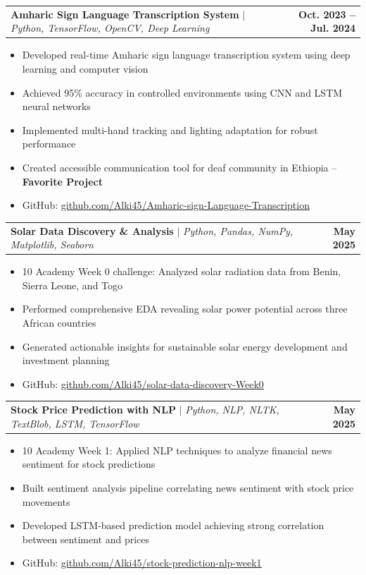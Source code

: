 \documentclass[letterpaper,11pt]{article}
\makeatletter
\newcommand{\resumeItem}[1]{
  \item\small{
    {#1 \vspace{-2pt}}
  }
}
\newcommand{\resumeProjectHeading}[2]{
    \item
    \begin{tabular*}{1.001\textwidth}{l@{\extracolsep{\fill}}r}
      \small#1 & \textbf{\small #2}\\
    \end{tabular*}\vspace{-7pt}
}
\newcommand{\resumeItemListStart}{\begin{itemize}}
\newcommand{\resumeItemListEnd}{\end{itemize}\vspace{-5pt}}
\makeatother
\begin{document}
      \resumeProjectHeading
          {\textbf{Amharic Sign Language Transcription System} $|$ \emph{Python, TensorFlow, OpenCV, Deep Learning}}{Oct. 2023 -- Jul. 2024}
          \resumeItemListStart
            \resumeItem{Developed real-time Amharic sign language transcription system using deep learning and computer vision}
            \resumeItem{Achieved 95\% accuracy in controlled environments using CNN and LSTM neural networks}
            \resumeItem{Implemented multi-hand tracking and lighting adaptation for robust performance}
            \resumeItem{Created accessible communication tool for deaf community in Ethiopia -- \textbf{Favorite Project}}
            \resumeItem{GitHub: \href{https://github.com/Alki45/Amharic-sign-Language-Transcription}{\underline{github.com/Alki45/Amharic-sign-Language-Transcription}}}
          \resumeItemListEnd
          \vspace{-13pt}
          
      \resumeProjectHeading
          {\textbf{Solar Data Discovery \& Analysis} $|$ \emph{Python, Pandas, NumPy, Matplotlib, Seaborn}}{May 2025}
          \resumeItemListStart
            \resumeItem{10 Academy Week 0 challenge: Analyzed solar radiation data from Benin, Sierra Leone, and Togo}
            \resumeItem{Performed comprehensive EDA revealing solar power potential across three African countries}
            \resumeItem{Generated actionable insights for sustainable solar energy development and investment planning}
            \resumeItem{GitHub: \href{https://github.com/Alki45/solar-data-discovery-Week0}{\underline{github.com/Alki45/solar-data-discovery-Week0}}}
          \resumeItemListEnd
          \vspace{-13pt}
          
      \resumeProjectHeading
          {\textbf{Stock Price Prediction with NLP} $|$ \emph{Python, NLP, NLTK, TextBlob, LSTM, TensorFlow}}{May 2025}
          \resumeItemListStart
            \resumeItem{10 Academy Week 1: Applied NLP techniques to analyze financial news sentiment for stock predictions}
            \resumeItem{Built sentiment analysis pipeline correlating news sentiment with stock price movements}
            \resumeItem{Developed LSTM-based prediction model achieving strong correlation between sentiment and prices}
            \resumeItem{GitHub: \href{https://github.com/Alki45/stock-prediction-nlp-week1}{\underline{github.com/Alki45/stock-prediction-nlp-week1}}}
          \resumeItemListEnd
          \vspace{-13pt}
          
\end{document}
